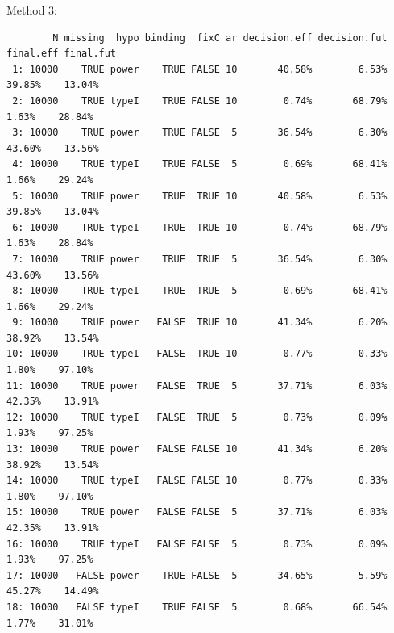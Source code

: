 \documentclass[12pt]{article}
\begin{document}
Method 3:
\begin{verbatim}
        N missing  hypo binding  fixC ar decision.eff decision.fut final.eff final.fut
 1: 10000    TRUE power    TRUE FALSE 10       40.58%        6.53%    39.85%    13.04%
 2: 10000    TRUE typeI    TRUE FALSE 10        0.74%       68.79%     1.63%    28.84%
 3: 10000    TRUE power    TRUE FALSE  5       36.54%        6.30%    43.60%    13.56%
 4: 10000    TRUE typeI    TRUE FALSE  5        0.69%       68.41%     1.66%    29.24%
 5: 10000    TRUE power    TRUE  TRUE 10       40.58%        6.53%    39.85%    13.04%
 6: 10000    TRUE typeI    TRUE  TRUE 10        0.74%       68.79%     1.63%    28.84%
 7: 10000    TRUE power    TRUE  TRUE  5       36.54%        6.30%    43.60%    13.56%
 8: 10000    TRUE typeI    TRUE  TRUE  5        0.69%       68.41%     1.66%    29.24%
 9: 10000    TRUE power   FALSE  TRUE 10       41.34%        6.20%    38.92%    13.54%
10: 10000    TRUE typeI   FALSE  TRUE 10        0.77%        0.33%     1.80%    97.10%
11: 10000    TRUE power   FALSE  TRUE  5       37.71%        6.03%    42.35%    13.91%
12: 10000    TRUE typeI   FALSE  TRUE  5        0.73%        0.09%     1.93%    97.25%
13: 10000    TRUE power   FALSE FALSE 10       41.34%        6.20%    38.92%    13.54%
14: 10000    TRUE typeI   FALSE FALSE 10        0.77%        0.33%     1.80%    97.10%
15: 10000    TRUE power   FALSE FALSE  5       37.71%        6.03%    42.35%    13.91%
16: 10000    TRUE typeI   FALSE FALSE  5        0.73%        0.09%     1.93%    97.25%
17: 10000   FALSE power    TRUE FALSE  5       34.65%        5.59%    45.27%    14.49%
18: 10000   FALSE typeI    TRUE FALSE  5        0.68%       66.54%     1.77%    31.01%
\end{verbatim}

\clearpage
\end{document}
